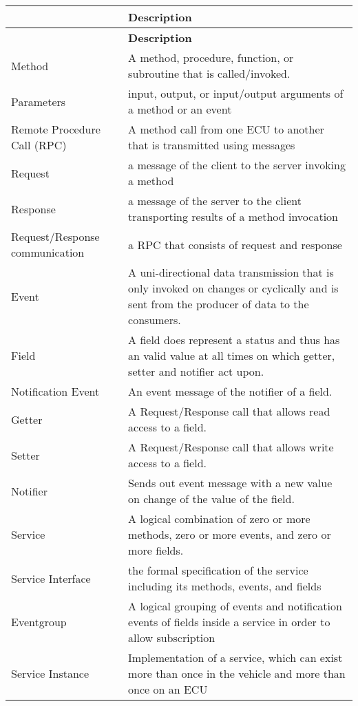 \tabulinesep=1mm
\begin{longtabu} spread 0pt [c]{*2{|X[-1]}|}
\hline
{}&{\bf Description  }\\
\endfirsthead
\hline
\endfoot
\hline
{}&{\bf Description  }\\
\endhead
Method &A method, procedure, function, or subroutine that is called/invoked. \\
Parameters &input, output, or input/output arguments of a method or an event \\
Remote Procedure Call (R\+PC) &A method call from one E\+CU to another that is transmitted using messages \\
Request &a message of the client to the server invoking a method \\
Response &a message of the server to the client transporting results of a method invocation \\
Request/\+Response communication &a R\+PC that consists of request and response \\
Event &A uni-\/directional data transmission that is only invoked on changes or cyclically and is sent from the producer of data to the consumers. \\
Field &A field does represent a status and thus has an valid value at all times on which getter, setter and notifier act upon. \\
Notification Event &An event message of the notifier of a field. \\
Getter &A Request/\+Response call that allows read access to a field. \\
Setter &A Request/\+Response call that allows write access to a field. \\
Notifier &Sends out event message with a new value on change of the value of the field. \\
Service &A logical combination of zero or more methods, zero or more events, and zero or more fields. \\
Service Interface &the formal specification of the service including its methods, events, and fields \\
Eventgroup &A logical grouping of events and notification events of fields inside a service in order to allow subscription \\
Service Instance &Implementation of a service, which can exist more than once in the vehicle and more than once on an E\+CU \\

\end{longtabu}
